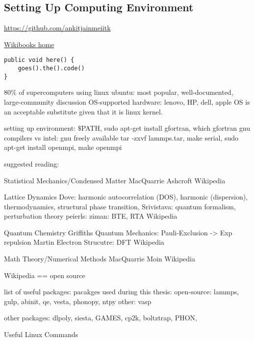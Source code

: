 \documentclass[letterpaper,12pt,amsmath,amssymb]{article}
\begin{document}


\subsection{Setting Up Computing Environment}


\href{https://github.com/ankitjainmeiitk}{https://github.com/ankitjainmeiitk}


\href{http://www.wikibooks.org}{Wikibooks home}

\lstset{language=Python}
\begin{lstlisting}[label=some-code,caption=Some Code]
public void here() {
	goes().the().code()
}
\end{lstlisting}

80$\%$ of supercomputers using linux
ubuntu: most popular, well-documented, large-community discussion
OS-supported hardware: lenovo, HP, dell, 
apple OS is an acceptable substitute given that it is linux kernel.

setting up environment: $\$$PATH, 
sudo apt-get install gfortran, which gfortran 
gnu compilers vs intel: gnu freely available
tar -zxvf lammps.tar, make serial, sudo apt-get install openmpi, make openmpi

suggested reading:

Statistical Mechanics/Condensed Matter
MacQuarrie
Ashcroft
Wikipedia

Lattice Dynamics
Dove: harmonic autocorrelation (DOS), harmonic (dispersion), 
thermodynamics, structural phase transition, 
Srivistava: quantum formalism, perturbation theory
peierls:
ziman: BTE, RTA
Wikipedia

Quantum Chemistry
Griffiths Quantum Mechanics: Pauli-Exclusion -> Exp repulsion 
Martin Electron Strucutre: DFT
Wikipedia

Math Theory/Numerical Methods
MacQuarrie
Moin
Wikipedia



Wikipedia == open source


list of useful packages: 
pacakges used during this thesis: 
open-source: lammps, gulp, abinit, qe, vesta, phonopy, ntpy
other: vasp

other packages: dlpoly, siesta, GAMES, cp2k, boltztrap, PHON, 

Useful Linux Commands
\end{document}
